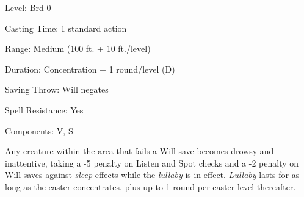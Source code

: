 
\begin{description*}
\item[Level:] Brd 0
\item[Casting Time:] 1 standard action
\item[Range:] Medium (100 ft. + 10 ft./level)
\item[Duration:] Concentration + 1 round/level (D)
\item[Saving Throw:] Will negates
\item[Spell Resistance:] Yes
\item[Components:] V, S
\end{description*}

Any creature within the area that fails a Will save becomes drowsy and inattentive,
taking a -5 penalty on Listen and Spot checks and a -2 penalty on Will saves against
\textit{sleep} effects while the \textit{lullaby} is in effect. \textit{Lullaby
}lasts for as long as the caster concentrates, plus up to 1 round per caster level
thereafter.
